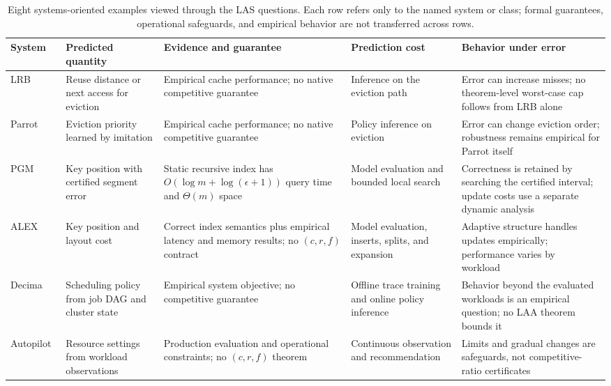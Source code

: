 \documentclass[acmsmall,screen,nonacm]{acmart}
\theoremstyle{acmdefinition}%
\begin{document}
\begin{table}[t!]
\centering
\setlength{\tabcolsep}{3pt}
\caption{Eight systems-oriented examples viewed through the LAS questions. Each row refers only to the named system or class; formal guarantees, operational safeguards, and empirical behavior are not transferred across rows.}
\label{tab:cases}
\scriptsize
\begin{tabular}{@{}
    >{\raggedright\arraybackslash}p{1.55cm}
    >{\raggedright\arraybackslash}p{2.62cm}
    >{\raggedright\arraybackslash}p{3.22cm}
    >{\raggedright\arraybackslash}p{2.38cm}
    >{\raggedright\arraybackslash}p{3.24cm}
@{}}
\toprule
\textbf{System} & \textbf{Predicted quantity} & \textbf{Evidence and guarantee} & \textbf{Prediction cost} & \textbf{Behavior under error} \\
\midrule
LRB~\cite{song2020lrb} & Reuse distance or next access for eviction & Empirical cache performance; no native competitive guarantee & Inference on the eviction path & Error can increase misses; no theorem-level worst-case cap follows from LRB alone \\
\addlinespace[2pt]
Parrot~\cite{liu2020parrot} & Eviction priority learned by imitation & Empirical cache performance; no native competitive guarantee & Policy inference on eviction & Error can change eviction order; robustness remains empirical for Parrot itself \\
\addlinespace[2pt]
PGM~\cite{ferragina2020pgm} & Key position with certified segment error & Static recursive index has $O(\!\log m+\log(\epsilon+1))$ query time and $\Theta(m)$ space & Model evaluation and bounded local search & Correctness is retained by searching the certified interval; update costs use a separate dynamic analysis \\
\addlinespace[2pt]
ALEX~\cite{ding2020alex} & Key position and layout cost & Correct index semantics plus empirical latency and memory results; no $(c,r,f)$ contract & Model evaluation, inserts, splits, and expansion & Adaptive structure handles updates empirically; performance varies by workload~\cite{wongkham2022updatable} \\
\addlinespace[2pt]
Decima~\cite{mao2019decima} & Scheduling policy from job DAG and cluster state & Empirical system objective; no competitive guarantee & Offline trace training and online policy inference & Behavior beyond the evaluated workloads is an empirical question; no LAA theorem bounds it \\
\addlinespace[2pt]
Autopilot~\cite{rzadca2020autopilot} & Resource settings from workload observations & Production evaluation and operational constraints; no $(c,r,f)$ theorem & Continuous observation and recommendation & Limits and gradual changes are safeguards, not competitive-ratio certificates \\

\end{tabular}
\end{table}
\end{document}
